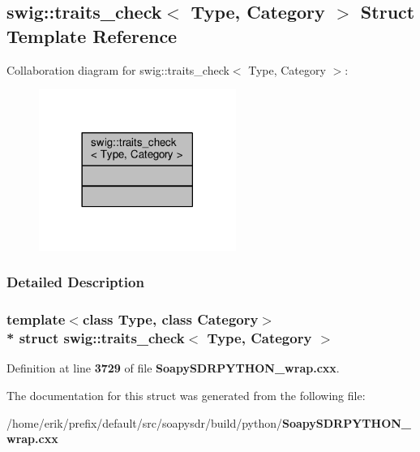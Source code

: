 \subsection{swig\+:\+:traits\+\_\+check$<$ Type, Category $>$ Struct Template Reference}
\label{structswig_1_1traits__check}


Collaboration diagram for swig\+:\+:traits\+\_\+check$<$ Type, Category $>$\+:
\nopagebreak
\begin{figure}[H]
\begin{center}
\leavevmode
\includegraphics[width=182pt]{df/d35/structswig_1_1traits__check__coll__graph}
\end{center}
\end{figure}


\subsubsection{Detailed Description}
\subsubsection*{template$<$class Type, class Category$>$\\*
struct swig\+::traits\+\_\+check$<$ Type, Category $>$}



Definition at line {\bf 3729} of file {\bf Soapy\+S\+D\+R\+P\+Y\+T\+H\+O\+N\+\_\+wrap.\+cxx}.



The documentation for this struct was generated from the following file\+:\begin{DoxyCompactItemize}
\item 
/home/erik/prefix/default/src/soapysdr/build/python/{\bf Soapy\+S\+D\+R\+P\+Y\+T\+H\+O\+N\+\_\+wrap.\+cxx}\end{DoxyCompactItemize}
